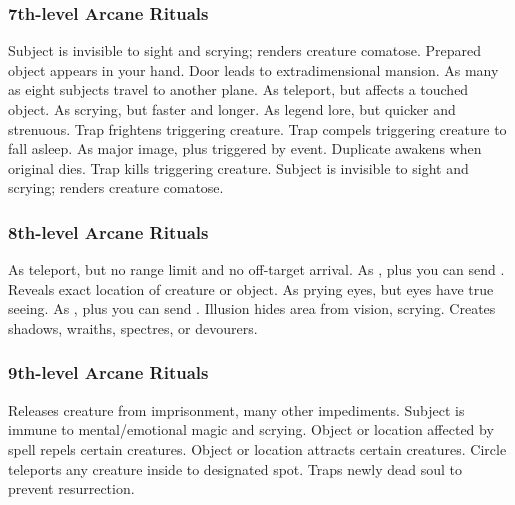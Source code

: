 \subsubsection{7th-level Arcane Rituals}
\begin{rituallist}
     Subject is invisible to sight and scrying; renders creature comatose.
     Prepared object appears in your hand.
    \F Door leads to extradimensional mansion.
    \F As many as eight subjects travel to another plane.
     As teleport, but affects a touched object.
     As scrying, but faster and longer.
     As legend lore, but quicker and strenuous.
     Trap frightens triggering creature.
     Trap compels triggering creature to fall asleep.
     As major image, plus triggered by event.
    \F Duplicate awakens when original dies.
     Trap kills triggering creature.
     Subject is invisible to sight and scrying; renders creature comatose.
\end{rituallist}

\subsubsection{8th-level Arcane Rituals}
\begin{rituallist}
     As teleport, but no range limit and no off-target arrival.
     As , plus you can send .
     Reveals exact location of creature or object.
     As prying eyes, but eyes have true seeing.
     As , plus you can send .
     Illusion hides area from vision, scrying.
    \M Creates shadows, wraiths, spectres, or devourers.
\end{rituallist}

\subsubsection{9th-level Arcane Rituals}
\begin{rituallist}
     Releases creature from imprisonment, many other impediments.
     Subject is immune to mental/emotional magic and scrying.
     Object or location affected by spell repels certain creatures.
    \F Object or location attracts certain creatures.
     Circle teleports any creature inside to designated spot.
    \F Traps newly dead soul to prevent resurrection.
\end{rituallist}


